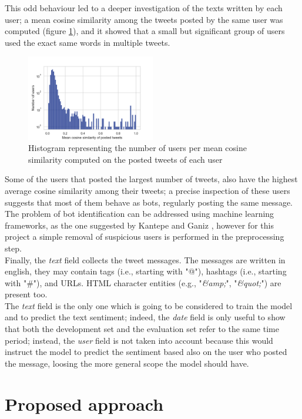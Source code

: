 \documentclass[conference]{IEEEtran}
\begin{document}
This odd behaviour led to a deeper investigation of the texts written by each user; a mean cosine similarity among the tweets posted by the same user was computed (figure \ref{fig:internal_similarity_users}), and it showed that a small but significant group of users used the exact same words in multiple tweets.  
\begin{figure}
    \includegraphics[width=0.5\textwidth]{internal_similarity_users}
    \caption[Mean cosine similarity]{Histogram representing the number of users per mean cosine similarity computed on the posted tweets of each user}
    \label{fig:internal_similarity_users}
\end{figure}
Some of the users that posted the largest number of tweets, also have the highest average cosine similarity among their tweets; a precise inspection of these users suggests that most of them behave as bots, regularly posting the same message. The problem of bot identification can be addressed using machine learning frameworks, as the one suggested by Kantepe and Ganiz \cite{8093483}, however for this project a simple removal of suspicious users is performed in the preprocessing step. \\
Finally, the \textit{text} field collects the tweet messages. The messages are written in english, they may contain tags (i.e., starting with "@"), hashtags (i.e., starting with "\#"), and URLs. HTML character entities (e.g., "\textit{\&amp;}", "\textit{\&quot;}") are present too. \\
The \textit{text} field is the only one which is going to be considered to train the model and to predict the text sentiment; indeed, the \textit{date} field is only useful to show that both the development set and the evaluation set refer to the same time period; instead, the \textit{user} field is not taken into account because this would instruct the model to predict the sentiment based also on the user who posted the message, loosing the more general scope the model should have. 

\section{Proposed approach}
\end{document}
